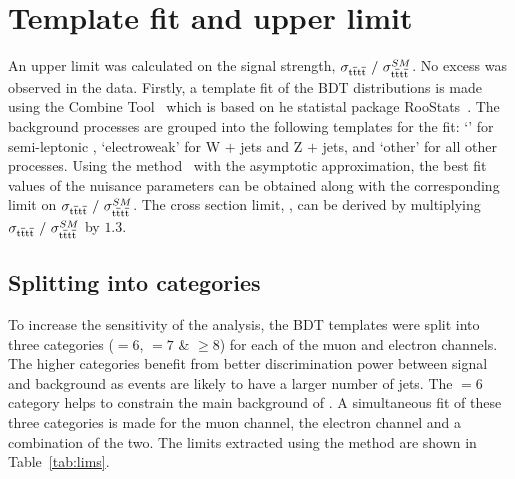 
\section{Template fit and upper limit}
\label{sec:limit}

An upper limit was calculated on the signal strength, $\sigma_{{\mathrm{t}\overline{\mathrm{t}}\mathrm{t}\overline{\mathrm{t}}}}~/~\sigma_{{\mathrm{t}\overline{\mathrm{t}}\mathrm{t}\overline{\mathrm{t}}}}^{SM} $. No excess was observed in the data. Firstly, a template fit of the BDT distributions is made using the Combine Tool~\cite{CMS-NOTE-2011-005} which is based on he statistal package RooStats~\cite{RooStats:2010,Read:2002hq,Junk:1999kv,Cowan:2011js}.
The background processes are grouped into the following templates for the fit: `\ttbar' for semi-leptonic \ttbar, `electroweak' for W $+$ jets and Z $+$ jets, and `\ttbar\textunderscore other' for all other \ttbar processes. Using the \CLS method~\cite{Junk1999435,0954-3899-28-10-313} with the asymptotic approximation, the best fit values of the nuisance parameters can be obtained along with the corresponding limit on $\sigma_{{\mathrm{t}\overline{\mathrm{t}}\mathrm{t}\overline{\mathrm{t}}}}~/~\sigma_{{\mathrm{t}\overline{\mathrm{t}}\mathrm{t}\overline{\mathrm{t}}}}^{SM} $. The cross section limit, \sigmatttt, can be derived by multiplying $\sigma_{{\mathrm{t}\overline{\mathrm{t}}\mathrm{t}\overline{\mathrm{t}}}}~/~\sigma_{{\mathrm{t}\overline{\mathrm{t}}\mathrm{t}\overline{\mathrm{t}}}}^{SM} $ by \sigmattttSM $1.3$.

\subsection{Splitting into \njets categories}
\label{sec:njetcatlimit}
To increase the sensitivity of the analysis, the BDT templates were split into three \njets categories (\njets $= 6$, \njets $= 7 $ \& \njets $\geq 8$) for each of the muon and electron channels. The higher \njets categories benefit from better discrimination power between signal and background as \tttt events are likely to have a larger number of jets. The \njets $= 6$ category helps to constrain the main background of \ttbar. A simultaneous fit of these three \njets categories is made for the muon channel, the electron channel and a combination of the two. The limits extracted using the \CLS method are shown in Table~\ref{tab:lims}.


